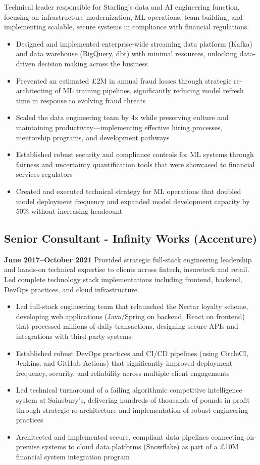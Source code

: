 \documentclass[a4paper]{scrartcl}
\begin{document}
Technical leader responsible for Starling's data and AI engineering function, focusing on infrastructure modernization, ML operations, team building, and implementing scalable, secure systems in compliance with financial regulations.
\begin{itemize}
	\item Designed and implemented enterprise-wide streaming data platform (Kafka) and data warehouse (BigQuery, dbt) with minimal resources, unlocking data-driven decision making across the business
	\item Prevented an estimated £2M in annual fraud losses through strategic re-architecting of ML training pipelines, significantly reducing model refresh time in response to evolving fraud threats
	\item Scaled the data engineering team by 4x while preserving culture and maintaining productivity—implementing effective hiring processes, mentorship programs, and development pathways
	\item Established robust security and compliance controls for ML systems through fairness and uncertainty quantification tools that were showcased to financial services regulators
	\item Created and executed technical strategy for ML operations that doubled model deployment frequency and expanded model development capacity by 50\% without increasing headcount
\end{itemize}

\subsection*{Senior Consultant - Infinity Works (Accenture)}
\textbf{June 2017--October 2021}
Provided strategic full-stack engineering leadership and hands-on technical expertise to clients across fintech, insuretech and retail. Led complete technology stack implementations including frontend, backend, DevOps practices, and cloud infrastructure.
\begin{itemize}
	\item Led full-stack engineering team that relaunched the Nectar loyalty scheme, developing web applications (Java/Spring on backend, React on frontend) that processed millions of daily transactions, designing secure APIs and integrations with third-party systems
	\item Established robust DevOps practices and CI/CD pipelines (using CircleCI, Jenkins, and GitHub Actions) that significantly improved deployment frequency, security, and reliability across multiple client engagements
	\item Led technical turnaround of a failing algorithmic competitive intelligence system at Sainsbury's, delivering hundreds of thousands of pounds in profit through strategic re-architecture and implementation of robust engineering practices
	\item Architected and implemented secure, compliant data pipelines connecting on-premise systems to cloud data platforms (Snowflake) as part of a £10M financial system integration program
\end{itemize}
\end{document}
